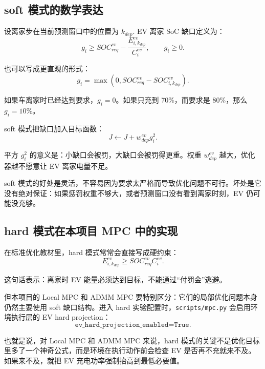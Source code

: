 \documentclass[UTF8,zihao=-4]{ctexart}
\begin{document}
\subsection{soft 模式的数学表达}

设离家步在当前预测窗口中的位置为 $k_{dep}$. EV 离家 SoC 缺口定义为：
\begin{equation}
g_i
\ge
SOC^{ev}_{req}
-
\frac{E^{ev}_{i,k_{dep}}}{C^{ev}_i},
\qquad
g_i\ge 0.
\end{equation}

也可以写成更直观的形式：
\begin{equation}
g_i
=
\max\left(
0,
SOC^{ev}_{req}
-
SOC^{ev}_{i,k_{dep}}
\right).
\end{equation}

如果车离家时已经达到要求，$g_i=0$。如果只充到 70\%，而要求是 80\%，那么 $g_i=10\%$。

soft 模式把缺口加入目标函数：
\begin{equation}
J
\leftarrow
J
+
w^{ev}_{dep}g_i^2.
\end{equation}

平方 $g_i^2$ 的意义是：小缺口会被罚，大缺口会被罚得更重。权重 $w^{ev}_{dep}$ 越大，优化器越不愿意让 EV 离家电量不足。

soft 模式的好处是灵活，不容易因为要求太严格而导致优化问题不可行。坏处是它没有绝对保证：如果惩罚权重不够大，或者预测窗口没有看到离家时刻，EV 仍可能没充够。

\subsection{hard 模式在本项目 MPC 中的实现}

在标准优化教材里，hard 模式常常会直接写成硬约束：
\begin{equation}
E^{ev}_{i,k_{dep}}
\ge
SOC^{ev}_{req}C^{ev}_i.
\end{equation}

这句话表示：离家时 EV 能量必须达到目标，不能通过“付罚金”逃避。

但本项目的 Local MPC 和 ADMM MPC 要特别区分：它们的局部优化问题本身仍然主要使用 soft 缺口结构。进入 hard 实验配置时，\texttt{scripts/mpc.py} 会启用环境执行层的 EV hard projection：
\begin{equation}
\texttt{ev\_hard\_projection\_enabled=True}.
\end{equation}

也就是说，对 Local MPC 和 ADMM MPC 来说，hard 模式的关键不是优化目标里多了一个神奇公式，而是环境在执行动作前会检查 EV 是否再不充就来不及。如果来不及，就把 EV 充电功率强制抬高到最低必要值。
\end{document}

